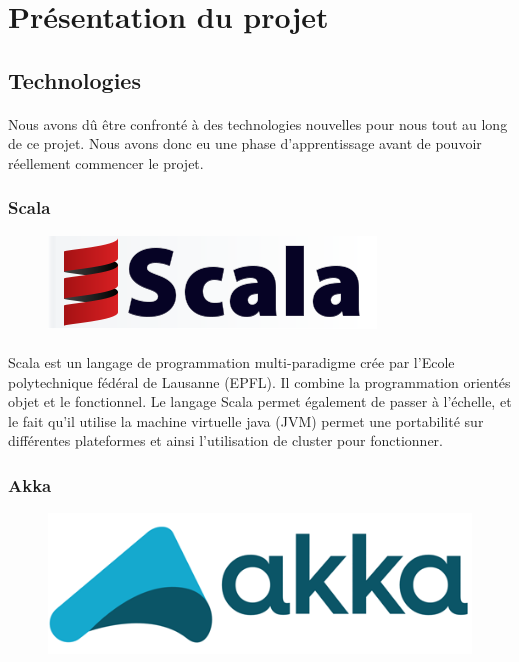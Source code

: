 \documentclass[a4paper,10pt]{article}
\begin{document}
\newpage

\section{Présentation du projet}

\subsection{Technologies}

\paragraph{}
Nous avons dû être confronté à des technologies nouvelles pour nous tout au long de ce projet. Nous avons donc eu une phase d'apprentissage avant de pouvoir réellement commencer le projet.

\subsubsection{Scala} 
\begin{figure}[h!]
\includegraphics[scale=0.15,right]{image/scala.png}
\end{figure}
\paragraph{}
Scala est un langage de programmation multi-paradigme crée par l’Ecole polytechnique fédéral de Lausanne (EPFL). Il combine la programmation orientés objet et le fonctionnel. Le langage Scala permet également de passer à l’échelle, et le fait qu’il utilise la machine virtuelle java (JVM) permet une portabilité sur différentes plateformes et ainsi l’utilisation de cluster pour fonctionner.

\subsubsection{Akka} 
\begin{figure}[h!]
\includegraphics[scale=0.1,right]{image/akka.png}
\end{figure}
\end{document}
